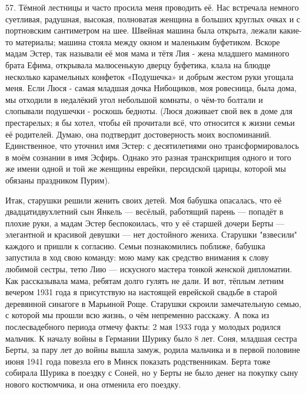 57. Тёмной лестницы и часто просила меня проводить её. Нас встречала немного суетливая, радушная, высокая, полноватая женщина в больших круглых очках и с портновским сантиметром на шее. Швейная машина была открыта, лежали какие-то материалы; машина стояла между окном и маленьким буфетиком. Вскоре мадам Эстер, так называли её моя мама и тётя Лия - жена младшего маминого брата Ефима, открывала малюсенькую дверцу буфетика, клала на блюдце несколько карамельных конфеток «Подушечка» и добрым жестом руки угощала меня. Если Люся - самая младшая дочка Нибощиков, моя ровесница, была дома, мы отходили в недалёкий угол небольшой комнаты, о чём-то болтали и слопывали подушечки - роскошь бедноты. (Люся доживает свой век в доме для престарелых; я бы хотел, чтобы ей прочитали всё, что относится к жизни семьи её родителей. Думаю, она подтвердит достоверность моих воспоминаний. Единственное, что уточнил имя Эстер: с десятилетиями оно трансформировалось в моём сознании в имя Эсфирь. Однако это разная транскрипция одного и того же имени одной и той же женщины еврейки, персидской царицы, которой мы обязаны праздником Пурим).

Итак, старушки решили женить своих детей. Моя бабушка опасалась, что её двадцатидвухлетний сын Янкель — весёлый, работящий парень — попадёт в плохие руки, а мадам Эстер беспокоилась, что у её старшей дочери Берты — элегантной и красивой девушки — нет достойного жениха. Старушки "взвесили" каждого и пришли к согласию. Семьи познакомились поближе, бабушка запустила в ход свою команду: мою маму как средство внимания к слову любимой сестры, тетю Лию — искусного мастера тонкой женской дипломатии. Как рассказывала мама, ребятам долго гулять не дали. И вот, тёплым летним вечером 1931 года я присутствую на настоящей еврейской свадьбе в старой деревянной синагоге в Марьиной Роще. Старушки скроили замечательную семью, с которой мы прошли всю жизнь, о чём непременно расскажу. А пока из послесвадебного периода отмечу факты: 2 мая 1933 года у молодых родился мальчик. К началу войны в Германии Шурику было 8 лет. Соня, младшая сестра Берты, за пару лет до войны вышла замуж, родила мальчика и в первой половине июня 1941 года повезла его в Минск показать родственникам. Берта тоже собирала Шурика в поездку с Соней, но у Берты не было денег на покупку сыну нового костюмчика, и она отменила его поездку.


